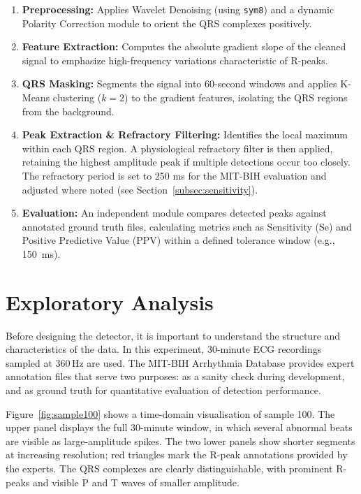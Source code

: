 \documentclass[11pt]{article}
\begin{document}
\begin{enumerate}[label=\arabic*.]
    \item \textbf{Preprocessing:} Applies Wavelet Denoising (using \texttt{sym8}) and a dynamic Polarity Correction module to orient the QRS complexes positively.
    \item \textbf{Feature Extraction:} Computes the absolute gradient slope of the cleaned signal to emphasize high-frequency variations characteristic of R-peaks.
    \item \textbf{QRS Masking:} Segments the signal into 60-second windows and applies K-Means clustering ($k=2$) to the gradient features, isolating the QRS regions from the background.
    \item \textbf{Peak Extraction \& Refractory Filtering:} Identifies the local maximum within each QRS region. A physiological refractory filter is then applied, retaining the highest amplitude peak if multiple detections occur too closely. The refractory period is set to 250 ms for the MIT-BIH evaluation and adjusted where noted (see Section~\ref{subsec:sensitivity}).

    \item \textbf{Evaluation:} An independent module compares detected peaks against annotated ground truth files, calculating metrics such as Sensitivity (Se) and Positive Predictive Value (PPV) within a defined tolerance window (e.g., \SI{150}{ms}).
\end{enumerate}


\section{Exploratory Analysis}\label{sec:exploratory}
Before designing the detector, it is important to understand the structure and characteristics of the data. In this experiment, 30-minute ECG recordings sampled at 360\,Hz are used. The MIT-BIH Arrhythmia Database provides expert annotation files that serve two purposes: as a sanity check during development, and as ground truth for quantitative evaluation of detection performance.

Figure~\ref{fig:sample100} shows a time-domain visualisation of sample 100. The upper panel displays the full 30-minute window, in which several abnormal beats are visible as large-amplitude spikes. The two lower panels show shorter segments at increasing resolution; red triangles mark the R-peak annotations provided by the experts. The QRS complexes are clearly distinguishable, with prominent R-peaks and visible P and T waves of smaller amplitude.
\end{document}
